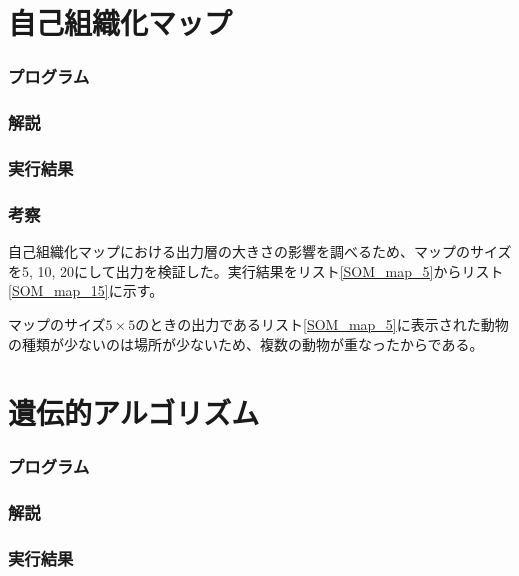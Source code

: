 \documentclass{jsarticle}
\begin{document}
\part{自己組織化マップ}
\section{プログラム}


\section{解説}


\section{実行結果}


\section{考察}
自己組織化マップにおける出力層の大きさの影響を調べるため、マップのサイズを5, 10, 20にして出力を検証した。実行結果をリスト\ref{SOM_map_5}からリスト\ref{SOM_map_15}に示す。





マップのサイズ$5\times5$のときの出力であるリスト\ref{SOM_map_5}に表示された動物の種類が少ないのは場所が少ないため、複数の動物が重なったからである。


\part{遺伝的アルゴリズム}
\section{プログラム}


\section{解説}


\section{実行結果}

\end{document}
